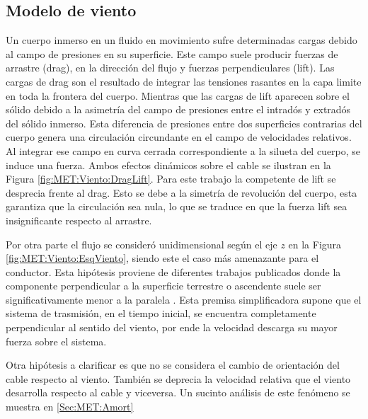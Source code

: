 \subsection{Modelo de viento}\label{Sec:PRE:Modeloviento}
Un cuerpo inmerso en un fluido en movimiento sufre determinadas cargas debido al campo de presiones en su superficie. Este campo suele producir fuerzas de arrastre (drag), en la dirección del flujo y fuerzas perpendiculares (lift). Las cargas de drag son el resultado de integrar las tensiones rasantes en la capa limite en toda la frontera del cuerpo. Mientras que las cargas de lift aparecen sobre el sólido debido a la asimetría del campo de presiones entre el intradós y extradós del sólido inmerso. Esta diferencia de presiones entre dos superficies contrarias del cuerpo genera una circulación circundante en el campo de velocidades relativos. Al integrar ese campo  en curva cerrada correspondiente a la silueta del cuerpo, se induce una fuerza. Ambos efectos dinámicos sobre el cable se ilustran en la Figura \ref{fig:MET:Viento:DragLift}. Para este trabajo la competente de lift se desprecia frente al drag.  Esto se debe a la simetría de revolución del cuerpo, esta garantiza que la circulación sea nula, lo que se traduce en que la fuerza lift sea insignificante respecto al arrastre. 

Por otra parte el flujo se consideró unidimensional según el eje $z$ en la Figura \ref{fig:MET:Viento:EsqViento}, siendo este el caso más amenazante para el conductor. Esta hipótesis proviene de diferentes trabajos publicados donde la componente perpendicular a la superficie terrestre o ascendente suele ser significativamente menor a la paralela \citep{duranona2009analysis} \citep{stengel2017measurements} \cite{yang2016nonlinear}. Esta premisa simplificadora supone que el sistema de trasmisión, en el tiempo inicial, se encuentra completamente perpendicular al sentido del viento, por ende la velocidad descarga su mayor fuerza sobre el sistema. 

Otra hipótesis a clarificar es que no se considera el cambio de orientación del cable respecto al viento. También se deprecia la velocidad relativa que el viento desarrolla respecto al cable y viceversa. Un sucinto análisis de este fenómeno se muestra en \ref{Sec:MET:Amort} 


